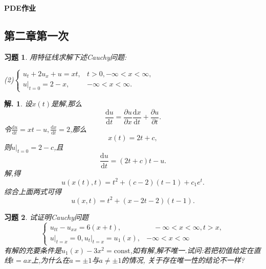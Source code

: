 \documentclass[a4paper,oneside,12pt]{ctexart}
\theoremstyle{plain}
\newtheorem{exercise}{习题}
\theoremstyle{nonumberplain}
\newtheorem{solution}{解.}
\theoremstyle{nonumberplain}
\newcommand{\dif}{\mathrm{d}}
\newcommand{\ptl}{\partial}
\newcommand{\cond}[2]{\left. #1\right|_{#2}}
\begin{document}
    \begin{center}
        \LARGE\bfseries
        PDE作业
    \end{center}

    \subsection*{第二章第一次}

    \begin{exercise}
        \label{ex:3}
        用特征线求解下述Cauchy问题:

        (2)$\begin{cases}
            u_t+2u_x+u=xt, & t>0,-\infty<x<\infty,\\
            \cond{u}{t=0}=2-x,&-\infty<x<\infty.
        \end{cases}$
    \end{exercise}

    \begin{solution}
        设$x(t)$是解,那么 
        \begin{equation*}
            \frac{\dif u}{\dif t}=\frac{\ptl u}{\ptl x}\frac{\dif x}{\dif t}+\frac{\ptl u}{\ptl t}.
        \end{equation*}
        令$\frac{\dif u}{\dif t}=xt-u,\frac{\dif x}{\dif t}=2$,那么 
        \begin{equation*}
            x(t)=2t+c,
        \end{equation*}
        则$\cond{u}{t=0}=2-c$,且 
        \begin{equation*}
            \frac{\dif u}{\dif t}=(2t+c)t-u.
        \end{equation*}
        解,得 
        \begin{equation*}
            u(x(t),t)=t^2+(c-2)(t-1)+c_1e^t.
        \end{equation*}
        综合上面两式可得
        \begin{equation*}
            u(x,t)=t^2+(x-2t-2)(t-1).
        \end{equation*}
    \end{solution}

    \begin{exercise}
        \label{ex:7}
        试证明Cauchy问题 
        \begin{equation*}
            \begin{cases}
                u_{tt}-u_{xx}=6(x+t),&\quad -\infty<x<\infty,t>x,\\
                \cond{u}{t=x}=0,\cond{u_t}{t=x}=u_1(x),&-\infty<x<\infty
            \end{cases}
        \end{equation*}
        有解的充要条件是$u_1(x)-3x^2=\mathrm{const}$,如有解,解不唯一.试问:若把初值给定在直线$t=ax$上,为什么在$a=\pm 1$与$a\neq\pm 1$的情况,
        关于存在唯一性的结论不一样?
    \end{exercise}
\end{document}
